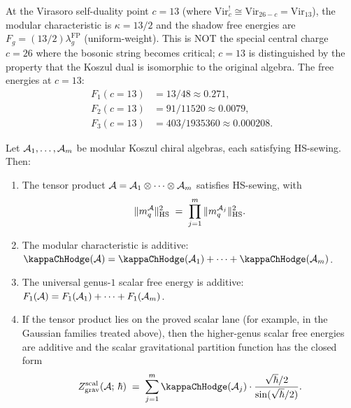 \begin{remark}
At the Virasoro self-duality point $c = 13$ (where $\mathrm{Vir}_c^! \cong \mathrm{Vir}_{26-c} = \mathrm{Vir}_{13}$), the modular characteristic is $\kappa = 13/2$ and the shadow free energies are $F_g = (13/2)\lambda_g^{\mathrm{FP}}$ \textup{(}uniform-weight\textup{)}. This is NOT the special central charge $c = 26$ where the bosonic string becomes critical; $c = 13$ is distinguished by the property that the Koszul dual is isomorphic to the original algebra. The free energies at $c = 13$:
\begin{align*}
F_1(c=13) &= 13/48 \approx 0.271, \\
F_2(c=13) &= 91/11520 \approx 0.0079, \\
F_3(c=13) &= 403/1935360 \approx 0.000208.
\end{align*}
\end{remark}

\begin{proposition}
Let $\mathcal{A}_1, \ldots, \mathcal{A}_m$ be modular Koszul chiral algebras, each satisfying HS-sewing. Then:
\begin{enumerate}[label=\textup{(\roman*)}]
\item The tensor product $\mathcal{A} = \mathcal{A}_1 \otimes \cdots \otimes \mathcal{A}_m$ satisfies HS-sewing, with
 \begin{equation}%
 \|m_q^{\cA}\|_{\HS}^2 \;=\; \prod_{j=1}^m \|m_q^{\cA_j}\|_{\HS}^2.
 \end{equation}
\item The modular characteristic is additive: $\kappaChHodge(\cA) = \kappaChHodge(\cA_1) + \cdots + \kappaChHodge(\cA_m)$.
\item The universal genus-$1$ scalar free energy is additive:
 $F_1(\mathcal{A}) = F_1(\mathcal{A}_1) + \cdots + F_1(\mathcal{A}_m)$.
\item If the tensor product lies on the proved scalar lane
 \textup{(}for example, in the Gaussian families treated above\textup{)},
 then the higher-genus scalar free energies are additive and the
 scalar gravitational partition function has the closed form
 \begin{equation}%
 Z_{\mathrm{grav}}^{\mathrm{scal}}(\cA;\,\hbar) \;=\; \sum_{j=1}^m \kappaChHodge(\cA_j) \cdot \frac{\sqrt{\hbar}/2}{\sin(\sqrt{\hbar}/2)}.
 \end{equation}
\end{enumerate}
\end{proposition}

